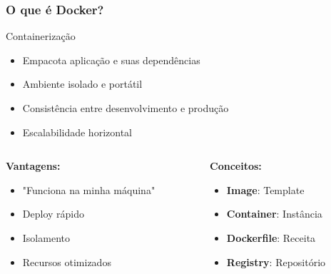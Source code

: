 \documentclass[aspectratio=169]{beamer}
\begin{document}
\begin{frame}
    \frametitle{O que é Docker?}
    \begin{block}{Containerização}
        \begin{itemize}
            \item Empacota aplicação e suas dependências
            \item Ambiente isolado e portátil
            \item Consistência entre desenvolvimento e produção
            \item Escalabilidade horizontal
        \end{itemize}
    \end{block}
    
    \begin{columns}
        \begin{column}{0.5\textwidth}
            \textbf{Vantagens:}
            \begin{itemize}
                \item "Funciona na minha máquina"
                \item Deploy rápido
                \item Isolamento
                \item Recursos otimizados
            \end{itemize}
        \end{column}
        \begin{column}{0.5\textwidth}
            \textbf{Conceitos:}
            \begin{itemize}
                \item \textbf{Image}: Template
                \item \textbf{Container}: Instância
                \item \textbf{Dockerfile}: Receita
                \item \textbf{Registry}: Repositório
            \end{itemize}
        \end{column}
    \end{columns}
\end{frame}
\end{document}
